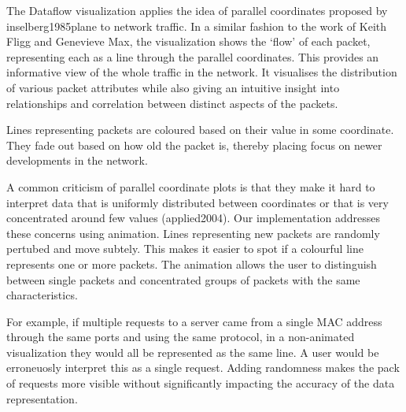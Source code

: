 The Dataflow visualization applies the idea of parallel coordinates proposed by inselberg1985plane to network traffic. In a similar fashion to the work of Keith Fligg and Genevieve Max, the visualization shows the `flow' of each packet, representing each as a line through the parallel coordinates. This provides an informative view of the whole traffic in the network. It visualises the distribution of various packet attributes while also giving an intuitive insight into relationships and correlation between distinct aspects of the packets.

Lines representing packets are coloured based on their value in some coordinate. They fade out based on how old the packet is, thereby placing focus on newer developments in the network. 

A common criticism of parallel coordinate plots is that they make it hard to interpret data that is uniformly distributed between coordinates or that is very concentrated around few values (applied2004). Our implementation addresses these concerns using animation. Lines representing new packets are randomly pertubed and move subtely. This makes it easier to spot if a colourful line represents one or more packets. The animation allows the user to distinguish between single packets and concentrated groups of packets with the same characteristics.

For example, if multiple requests to a server came from a single MAC address through the same ports and using the same protocol, in a non-animated visualization they would all be represented as the same line. A user would be erroneuosly interpret this as a single request. Adding randomness makes the pack of requests more visible without significantly impacting the accuracy of the data representation.